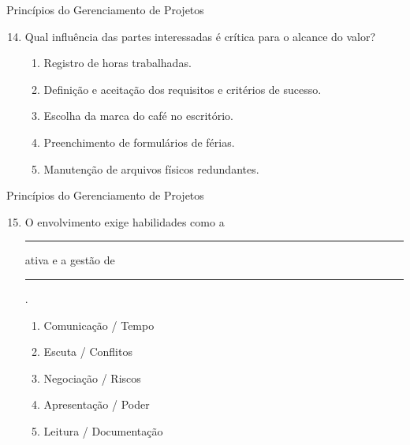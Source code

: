 \documentclass{beamer}
\begin{document}
\begin{frame}{Princípios do Gerenciamento de Projetos}
	\begin{enumerate}
		\setcounter{enumi}{13}
		\justifying
		\item Qual influência das partes interessadas é crítica para o alcance do valor?
		\begin{enumerate}[a]
			\item Registro de horas trabalhadas.
			\item \alert<2>{Definição e aceitação dos requisitos e critérios de sucesso.}
			\item Escolha da marca do café no escritório.
			\item Preenchimento de formulários de férias.
			\item Manutenção de arquivos físicos redundantes.
		\end{enumerate}
	\end{enumerate}
\end{frame}

\begin{frame}{Princípios do Gerenciamento de Projetos}
	\begin{enumerate}
		\setcounter{enumi}{14}
		\justifying
		\item O envolvimento exige habilidades como a \rule{60pt}{1pt} ativa e a gestão de \rule{60pt}{1pt}.
		\begin{enumerate}[a]
			\item Comunicação / Tempo
			\item \alert<2>{Escuta / Conflitos}
			\item Negociação / Riscos
			\item Apresentação / Poder
			\item Leitura / Documentação
		\end{enumerate}
	\end{enumerate}
\end{frame}
\end{document}

